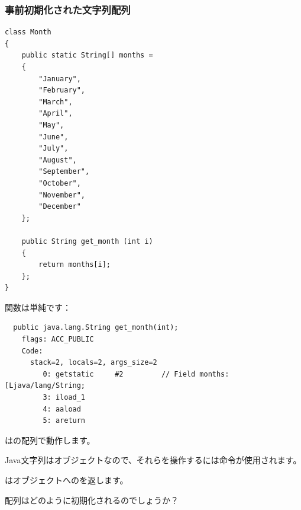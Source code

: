 \subsubsection{事前初期化された文字列配列}
\label{Java_2D_array_month}

\begin{lstlisting}[style=customjava]
class Month
{
	public static String[] months = 
	{
		"January", 
		"February", 
		"March", 
		"April",
		"May",
		"June",
		"July",
		"August",
		"September",
		"October",
		"November",
		"December"
	};

	public String get_month (int i)
	{
		return months[i];
	};
} 
\end{lstlisting}

関数は単純です：

\begin{lstlisting}
  public java.lang.String get_month(int);
    flags: ACC_PUBLIC
    Code:
      stack=2, locals=2, args_size=2
         0: getstatic     #2         // Field months:[Ljava/lang/String;
         3: iload_1       
         4: aaload        
         5: areturn       
\end{lstlisting}

はの配列で動作します。

Java文字列はオブジェクトなので、それらを操作するには命令が使用されます。

はオブジェクトへのを返します。


配列はどのように初期化されるのでしょうか？


